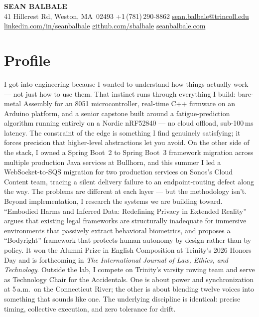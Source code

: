 \documentclass[10pt, letterpaper]{article}
\begin{document}
\begin{center}
  {\LARGE \textbf{SEAN BALBALE}} \\[4pt]
  \small
  41 Hillcrest Rd, Weston, MA~02493 \quad\textbar\quad
  +1\,(781)\,290-8862 \quad\textbar\quad
  \href{mailto:sean.balbale@trincoll.edu}{sean.balbale@trincoll.edu} \\[2pt]
  \href{https://www.linkedin.com/in/seanbalbale/}{linkedin.com/in/seanbalbale} \quad\textbar\quad
  \href{https://github.com/sbalbale}{github.com/sbalbale} \quad\textbar\quad
  \href{https://www.seanbalbale.com}{seanbalbale.com}
\end{center}
\vspace{-4pt}

\section{Profile}

I got into engineering because I wanted to understand how things actually work ---
not just how to use them. That instinct runs through everything I build: bare-metal
Assembly for an 8051 microcontroller, real-time C++ firmware on an Arduino platform,
and a senior capstone built around a fatigue-prediction algorithm running entirely on
a Nordic nRF52840 --- no cloud offload, sub-100\,ms latency. The constraint of the
edge is something I find genuinely satisfying; it forces precision that higher-level
abstractions let you avoid. On the other side of the stack, I owned a Spring Boot~2
to Spring Boot~3 framework migration across multiple production Java services at
Bullhorn, and this summer I led a WebSocket-to-SQS migration for two production
services on Sonos's Cloud Content team, tracing a silent delivery failure to an
endpoint-routing defect along the way. The problems are different at each layer ---
but the methodology isn't.\\


Beyond implementation, I research the systems we are building toward.
``Embodied Harms and Inferred Data: Redefining Privacy in Extended Reality''
argues that existing legal frameworks are structurally inadequate for immersive
environments that passively extract behavioral biometrics, and proposes a
``Bodyright'' framework that protects human autonomy by design rather than by policy.
It won the Alumni Prize in English Composition at Trinity's 2026 Honors Day and is
forthcoming in \textit{The International Journal of Law, Ethics, and Technology}.
Outside the lab, I compete on Trinity's varsity rowing team and serve as Technology
Chair for the Accidentals. One is about power and synchronization at 5\,a.m.\ on the
Connecticut River; the other is about blending twelve voices into something that sounds
like one. The underlying discipline is identical: precise timing, collective
execution, and zero tolerance for drift.
\end{document}
